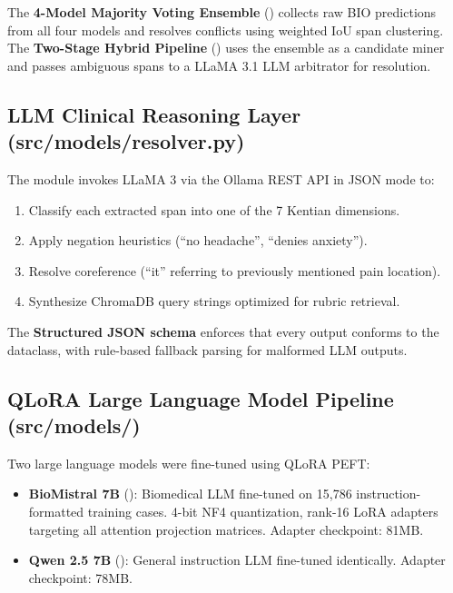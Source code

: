The \textbf{4-Model Majority Voting Ensemble} () collects raw BIO predictions from all four models and resolves conflicts using weighted IoU span clustering. The \textbf{Two-Stage Hybrid Pipeline} () uses the ensemble as a candidate miner and passes ambiguous spans to a LLaMA 3.1 LLM arbitrator for resolution.

\subsection{LLM Clinical Reasoning Layer (src/models/resolver.py)}

The  module invokes LLaMA 3 via the Ollama REST API in JSON mode to:
\begin{enumerate}
  \item Classify each extracted span into one of the 7 Kentian dimensions.
  \item Apply negation heuristics (``no headache'', ``denies anxiety'').
  \item Resolve coreference (``it'' referring to previously mentioned pain location).
  \item Synthesize ChromaDB query strings optimized for rubric retrieval.
\end{enumerate}

The \textbf{Structured JSON schema} enforces that every output conforms to the  dataclass, with rule-based fallback parsing for malformed LLM outputs.

\subsection{QLoRA Large Language Model Pipeline (src/models/)}

Two large language models were fine-tuned using QLoRA PEFT:

\begin{itemize}
  \item \textbf{BioMistral 7B} (): Biomedical LLM fine-tuned on 15,786 instruction-formatted training cases. 4-bit NF4 quantization, rank-16 LoRA adapters targeting all attention projection matrices. Adapter checkpoint: 81MB.
  \item \textbf{Qwen 2.5 7B} (): General instruction LLM fine-tuned identically. Adapter checkpoint: 78MB.
\end{itemize}

